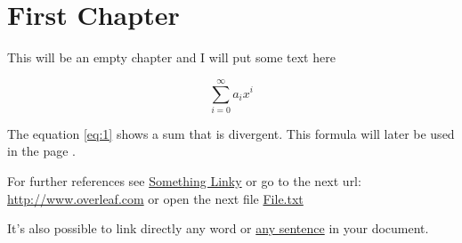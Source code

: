 \documentclass{book}
\begin{document}
\tableofcontents

\chapter{First Chapter}

This will be an empty chapter and I will put some text here

\begin{equation}
\label{eq:1}
\sum_{i=0}^{\infty} a_i x^i
\end{equation}

The equation \ref{eq:1} shows a sum that is divergent. This formula 
will later be used in the page \pageref{second}.

For further references see \href{http://www.overleaf.com}{Something 
Linky} or go to the next url: \url{http://www.overleaf.com} or open 
the next file \href{run:./file.txt}{File.txt}

It's also possible to link directly any word or 
\hyperlink{thesentence}{any sentence} in your document.
\end{document}
